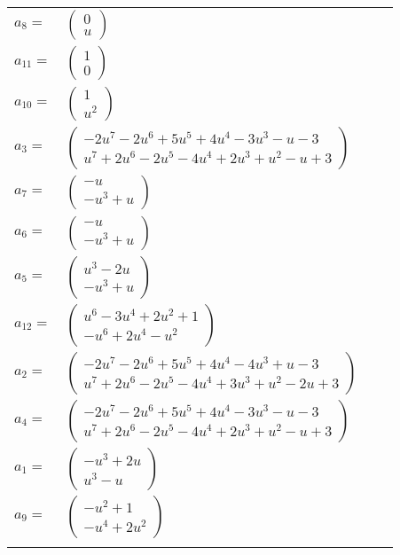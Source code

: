 \documentclass[1p]{elsarticle_modified}
\theoremstyle{definition}
\begin{document}
\begin{tabular}{m{7pt} m{180pt} m{7pt} m{180pt} }
\flushright $a_{8}=$&$\begin{pmatrix}0\\u\end{pmatrix}$ \\
\flushright $a_{11}=$&$\begin{pmatrix}1\\0\end{pmatrix}$ \\
\flushright $a_{10}=$&$\begin{pmatrix}1\\u^2\end{pmatrix}$ \\
\flushright $a_{3}=$&$\begin{pmatrix}-2 u^7-2 u^6+5 u^5+4 u^4-3 u^3- u-3\\u^7+2 u^6-2 u^5-4 u^4+2 u^3+u^2- u+3\end{pmatrix}$ \\
\flushright $a_{7}=$&$\begin{pmatrix}- u\\- u^3+u\end{pmatrix}$ \\
\flushright $a_{6}=$&$\begin{pmatrix}- u\\- u^3+u\end{pmatrix}$ \\
\flushright $a_{5}=$&$\begin{pmatrix}u^3-2 u\\- u^3+u\end{pmatrix}$ \\
\flushright $a_{12}=$&$\begin{pmatrix}u^6-3 u^4+2 u^2+1\\- u^6+2 u^4- u^2\end{pmatrix}$ \\
\flushright $a_{2}=$&$\begin{pmatrix}-2 u^7-2 u^6+5 u^5+4 u^4-4 u^3+u-3\\u^7+2 u^6-2 u^5-4 u^4+3 u^3+u^2-2 u+3\end{pmatrix}$ \\
\flushright $a_{4}=$&$\begin{pmatrix}-2 u^7-2 u^6+5 u^5+4 u^4-3 u^3- u-3\\u^7+2 u^6-2 u^5-4 u^4+2 u^3+u^2- u+3\end{pmatrix}$ \\
\flushright $a_{1}=$&$\begin{pmatrix}- u^3+2 u\\u^3- u\end{pmatrix}$ \\
\flushright $a_{9}=$&$\begin{pmatrix}- u^2+1\\- u^4+2 u^2\end{pmatrix}$\\&\end{tabular}
\end{document}
